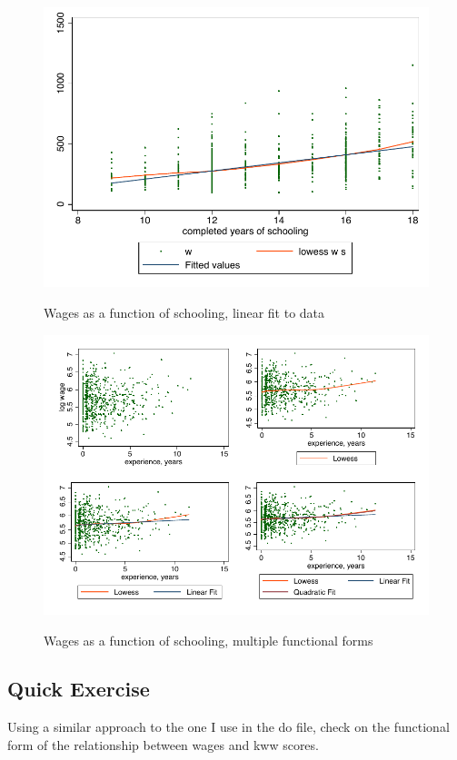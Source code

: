 \documentclass[12pt]{article}
\begin{document}
\begin{figure}[ht!]
  \centering
  \caption{Wages as a function of schooling, linear fit to data}
\includegraphics{lfit1}
  \label{fig:lfit}
\end{figure}


\begin{figure}[ht!]
  \centering
  \caption{Wages as a function of schooling, multiple functional forms}
  \includegraphics{logfit}
  \label{fig:mutlfit}
\end{figure}
\subsection{Quick Exercise}
Using a similar approach to the one I use in the do file, check on the
functional form of the relationship between wages and kww scores. 
\end{document}
